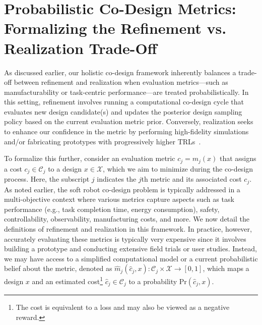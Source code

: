 \section{Probabilistic Co-Design Metrics: Formalizing the Refinement vs. Realization Trade-Off}\label{sec:apx:holisticcodesign:probabilistic_co_design_metrics}
As discussed earlier, our holistic co-design framework inherently balances a trade-off between refinement and realization when evaluation metrics—such as manufacturability or task-centric performance—are treated probabilistically. In this setting, refinement involves running a computational co-design cycle that evaluates new design candidate(s) and updates the posterior design sampling policy based on the current evaluation metric prior. Conversely, realization seeks to enhance our confidence in the metric by performing high-fidelity simulations and/or fabricating prototypes with progressively higher \glspl{TRL}~\citep{junge2022leveraging}.

To formalize this further, consider an evaluation metric $c_j = m_j(x)$ that assigns a cost $c_j \in \mathcal{C}_j$ to a design $x \in \mathcal{X}$, which we aim to minimize during the co-design process. 
Here, the subscript $j$ indicates the $j$th metric and its associated cost $c_j$.
As noted earlier, the soft robot co-design problem is typically addressed in a multi-objective context where various metrics capture aspects such as task performance (e.g., task completion time, energy consumption), safety, controllability, observability, manufacturing costs, and more. We now detail the definitions of refinement and realization in this framework.
In practice, however, accurately evaluating these metrics is typically very expensive since it involves building a prototype and conducting extensive field trials or user studies. Instead, we may have access to a simplified computational model or a current probabilistic belief about the metric, denoted as $\hat{m}_j(\hat{c}_j, x): \mathcal{C}_j \times \mathcal{X} \to [0,1]$,
which maps a design $x$ and an estimated cost\footnote{The cost is equivalent to a loss and may also be viewed as a negative reward.} $\hat{c}_j \in \mathcal{C}_j$ to a probability $\mathrm{Pr}(\hat{c}_j,x)$.

